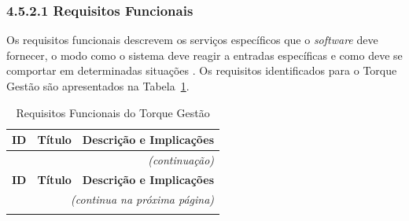 \documentclass[12pt, a4paper]{article}
\begin{document}
\subsubsection{4.5.2.1 Requisitos Funcionais}

Os requisitos funcionais descrevem os serviços específicos que o
\textit{software} deve fornecer, o modo como o sistema deve reagir a entradas
específicas e como deve se comportar em determinadas situações
\cite{sommerville2011}. Os requisitos identificados para o Torque Gestão são
apresentados na Tabela~\ref{tab:rf}.


\begin{longtable}{|p{1.2cm}|p{3.5cm}|p{9.5cm}|}
\caption{Requisitos Funcionais do Torque Gestão}
\label{tab:rf} \\

\hline
\textbf{ID} & \textbf{Título} & \textbf{Descrição e Implicações} \\
\hline
\endfirsthead

\multicolumn{3}{r}{\footnotesize\textit{(continuação)}} \\
\hline
\textbf{ID} & \textbf{Título} & \textbf{Descrição e Implicações} \\
\hline
\endhead

\hline
\multicolumn{3}{r}{\footnotesize\textit{(continua na próxima página)}} \\
\endfoot

\hline
\endlastfoot


\end{longtable}
\end{document}
